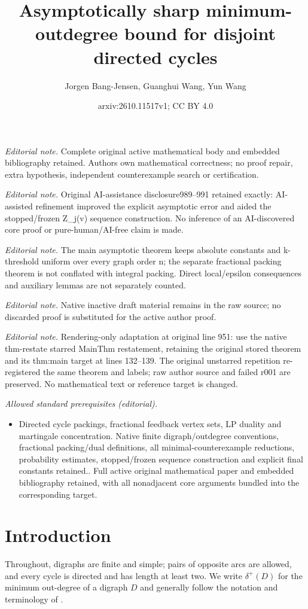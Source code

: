 \documentclass[10pt,a4paper]{article}
\title{Asymptotically sharp minimum-outdegree bound for disjoint directed cycles}
\author{Jorgen Bang-Jensen, Guanghui Wang, Yun Wang}
\date{arxiv:2610.11517v1; CC BY 4.0}
\numberwithin{equation}{section}
\begin{document}
\maketitle
\noindent\textit{Editorial note.} Complete original active mathematical body and embedded bibliography retained. Authors own mathematical correctness; no proof repair, extra hypothesis, independent counterexample search or certification.\par\medskip
\noindent\textit{Editorial note.} Original AI-assistance disclosure989--991 retained exactly: AI-assisted refinement improved the explicit asymptotic error and aided the stopped/frozen Z\_j(v) sequence construction. No inference of an AI-discovered core proof or pure-human/AI-free claim is made.\par\medskip
\noindent\textit{Editorial note.} The main asymptotic theorem keeps absolute constants and k-threshold uniform over every graph order n; the separate fractional packing theorem is not conflated with integral packing. Direct local/epsilon consequences and auxiliary lemmas are not separately counted.\par\medskip
\noindent\textit{Editorial note.} Native inactive draft material remains in the raw source; no discarded proof is substituted for the active author proof.\par\medskip
\noindent\textit{Editorial note.} Rendering-only adaptation at original line 951: use the native thm-restate starred MainThm restatement, retaining the original stored theorem and its thm:main target at lines 132--139. The original unstarred repetition re-registered the same theorem and labels; raw author source and failed r001 are preserved. No mathematical text or reference target is changed.\par\medskip
\noindent\textit{Allowed standard prerequisites (editorial).}\begin{itemize}
\item Directed cycle packings, fractional feedback vertex sets, LP duality and martingale concentration. Native finite digraph/outdegree conventions, fractional packing/dual definitions, all minimal-counterexample reductions, probability estimates, stopped/frozen sequence construction and explicit final constants retained.. Full active original mathematical paper and embedded bibliography retained, with all nonadjacent core arguments bundled into the corresponding target.
\end{itemize}\medskip
\section{Introduction}
Throughout, digraphs are finite and simple; pairs of
opposite arcs are allowed, and every cycle is directed and has length at
least two. We write $\delta^+(D)$ for the minimum out-degree of a
digraph $D$ and generally follow the notation and terminology of \cite{bang2009}.
\end{document}

